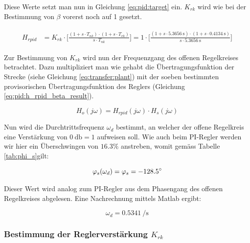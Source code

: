 Diese  Werte setzt man nun in Gleichung \ref{eq:pid:target} ein. $K_{rk}$ wird
wie bei der Bestimmung von $\beta$ vorerst noch auf 1 gesetzt.

\begin{gather} \label{eq:pid:h_rpid_beta_result}
    \begin{split}
        H_{rpid} & = K_{rk} \cdot \biggl[ \frac{(1 + s \cdot T_{nk}               ) \cdot (1 + s \cdot T_{vk}               ) }{ s \cdot T_{nk}               } \biggr]
                   = 1      \cdot \biggl[ \frac{(1 + s \cdot \SI{5.3656}{\second} ) \cdot (1 + s \cdot \SI{0.4134}{\second} ) }{ s \cdot \SI{5.3656}{\second} } \biggr]
    \end{split}
\end{gather}

Zur Bestimmung von $K_{rk}$ wird nun der Frequenzgang des offenen Regelkreises
betrachtet. Dazu  multipliziert  man  wie  gehabt  die  \"Ubertragungsfunktion
der  Strecke   (siehe  Gleichung   \ref{eq:transfer:plant})  mit   der  soeben
bestimmten  provisorischen   \"Ubertragungsfunktion  des   Reglers  (Gleichung
\ref{eq:pid:h_rpid_beta_result}).

\begin{equation} \label{eq:pid:h_o_k_rk_one}
    H_{o}(j\omega) = H_{rpid}(j\omega) \cdot H_s(j\omega)
\end{equation}

Nun wird  die Durchtrittsfrequenz $\omega_d$  bestimmt, an welcher  der offene
Regelkreis eine  Verst\"arkung von $\SI{0}{\decibel} =  1$ aufweisen soll. Wie
auch  beim  PI-Regler  werden  wir   hier  ein  \"Uberschwingen  von  $16.3\%$
anstreben, womit gem\"ass Tabelle \ref{tab:phi_s}gilt:

\begin{equation} \label{eq:pid:omega_d_target}
    \varphi_s(\omega_d) = \varphi_s = -128.5\degree
\end{equation}

Dieser Wert wird analog zum PI-Regler aus dem Phasengang des offenen Regelkreises
abgelesen.  Eine Nachrechnung mittels Matlab ergibt:


\begin{equation} \label{eq:pid:omega_d_target}
    \omega_d = \SI{0.5341}{\per\second}
\end{equation}


\subsubsection{Bestimmung der Reglerverst\"arkung $K_{rk}$}

